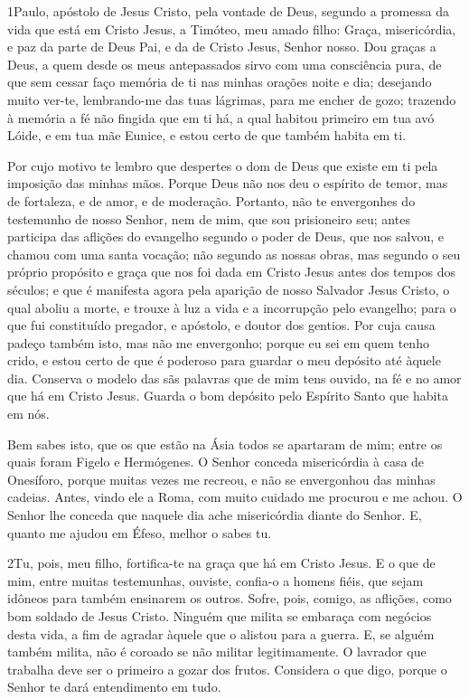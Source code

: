 
\lettrine{1} Paulo, apóstolo de Jesus Cristo, pela vontade de
Deus, segundo a promessa da vida que está em Cristo Jesus, a
Timóteo, meu amado filho: Graça, misericórdia, e paz da parte de
Deus Pai, e da de Cristo Jesus, Senhor nosso. Dou graças a Deus,
a quem desde os meus antepassados sirvo com uma consciência pura, de
que sem cessar faço memória de ti nas minhas orações noite e dia;
desejando muito ver-te, lembrando-me das tuas lágrimas, para me
encher de gozo; trazendo à memória a fé não fingida que em ti
há, a qual habitou primeiro em tua avó Lóide, e em tua mãe Eunice, e
estou certo de que também habita em ti.

Por cujo motivo te lembro que despertes o dom de Deus que existe
em ti pela imposição das minhas mãos. Porque Deus não nos deu o
espírito de temor, mas de fortaleza, e de amor, e de moderação.
Portanto, não te envergonhes do testemunho de nosso Senhor, nem
de mim, que sou prisioneiro seu; antes participa das aflições do
evangelho segundo o poder de Deus, que nos salvou, e chamou com
uma santa vocação; não segundo as nossas obras, mas segundo o seu
próprio propósito e graça que nos foi dada em Cristo Jesus antes dos
tempos dos séculos; e que é manifesta agora pela aparição de
nosso Salvador Jesus Cristo, o qual aboliu a morte, e trouxe à luz a
vida e a incorrupção pelo evangelho; para o que fui
constituído pregador, e apóstolo, e doutor dos gentios. Por
cuja causa padeço também isto, mas não me envergonho; porque eu sei
em quem tenho crido, e estou certo de que é poderoso para guardar o
meu depósito até àquele dia. Conserva o modelo das sãs
palavras que de mim tens ouvido, na fé e no amor que há em Cristo
Jesus. Guarda o bom depósito pelo Espírito Santo que habita
em nós.

Bem sabes isto, que os que estão na Ásia todos se apartaram de
mim; entre os quais foram Figelo e Hermógenes. O Senhor
conceda misericórdia à casa de Onesíforo, porque muitas vezes me
recreou, e não se envergonhou das minhas cadeias. Antes,
vindo ele a Roma, com muito cuidado me procurou e me achou. O
Senhor lhe conceda que naquele dia ache misericórdia diante do
Senhor. E, quanto me ajudou em Éfeso, melhor o sabes tu.

\medskip

\lettrine{2} Tu, pois, meu filho, fortifica-te na graça que há
em Cristo Jesus. E o que de mim, entre muitas testemunhas,
ouviste, confia-o a homens fiéis, que sejam idôneos para também
ensinarem os outros. Sofre, pois, comigo, as aflições, como bom
soldado de Jesus Cristo. Ninguém que milita se embaraça com
negócios desta vida, a fim de agradar àquele que o alistou para a
guerra. E, se alguém também milita, não é coroado se não militar
legitimamente. O lavrador que trabalha deve ser o primeiro a
gozar dos frutos. Considera o que digo, porque o Senhor te dará
entendimento em tudo.

